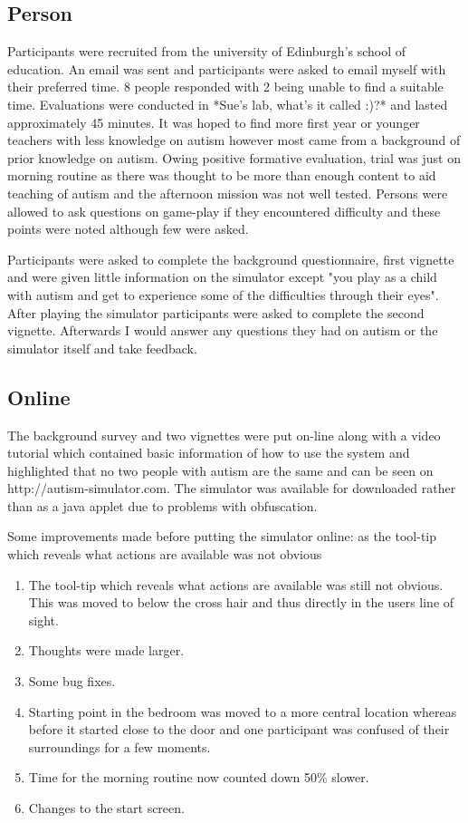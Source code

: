 \subsection{Person}
Participants were recruited from the university of Edinburgh's school of education. An email was sent and participants were asked to email myself with their preferred time. 8 people responded with 2 being unable to find a suitable time. Evaluations were conducted in *Sue's lab, what's it called :)?* and lasted approximately 45 minutes. It was hoped to find more first year or younger teachers with less knowledge on autism however most came from a background of prior knowledge on autism. Owing positive formative evaluation, trial was just on morning routine as there was thought to be more than enough content to aid teaching of autism and the afternoon mission was not well tested. Persons were allowed to ask questions on game-play if they encountered difficulty and these points were noted although few were asked.

Participants were asked to complete the background questionnaire, first vignette and were given little information on the simulator except "you play as a child with autism and get to experience some of the difficulties through their eyes". After playing the simulator participants were asked to complete the second vignette. Afterwards I would answer any questions they had on autism or the simulator itself and take feedback. 

\subsection{Online}

The background survey and two vignettes were put on-line along with a video tutorial which contained basic information of how to use the system and highlighted that no two people with autism are the same and can be seen on http://autism-simulator.com. The simulator was available for downloaded rather than as a java applet due to problems with obfuscation. 

Some improvements made before putting the simulator online: as the tool-tip which reveals what actions are available was not obvious

\begin{enumerate}
\item The tool-tip which reveals what actions are available was still not obvious. This was moved to below the cross hair and thus directly in the users line of sight.
\item Thoughts were made larger.
\item Some bug fixes. 
\item Starting point in the bedroom was moved to a more central location whereas before it started close to the door and one participant was confused of their surroundings for a few moments.
\item Time for the morning routine now counted down 50\% slower.
\item Changes to the start screen.
\end{enumerate}

